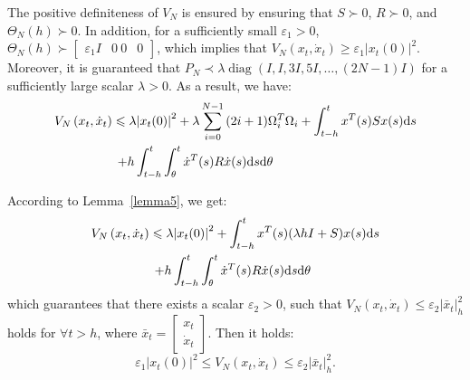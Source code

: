\documentclass[a4paper]{cas-sc}
\begin{document}
The positive definiteness of $V_N$ is ensured by ensuring that $S \succ 0$, $R \succ 0$, and ${\Theta _N}(h) \succ 0$. In addition, for a sufficiently small ${\varepsilon _1} > 0$, ${\Theta _N}(h) \succ \left[ {\begin{array}{*{20}{c}}
  {{\varepsilon_1}I} & 0 \
  0 & 0
  \end{array}} \right]$, which implies that ${V_N}\left( {{x_t},{{\dot x}_t}} \right) \geqslant {\varepsilon _1}{\left| {{x_t}(0)} \right|^2}$. Moreover, it is guaranteed that ${P_N} \prec \lambda \operatorname{diag} (I,I,3I,5I, \ldots ,(2N - 1)I)$ for a sufficiently large scalar $\lambda > 0$. As a result, we have:
\begin{equation}
  \begin{gathered}
    {V_N}\left( {{x_t},{{\dot x}_t}} \right) \leqslant \lambda {\left| {{x_t}(0)} \right|^2} + \lambda \sum\limits_{i = 0}^{N - 1} {(2i + 1)} \Omega _i^T{\Omega _i} + \int_{t - h}^t {{x^T}} (s)Sx(s){\text{d}}s \hfill \\
    \quad \quad \quad \quad \quad  + h\int_{t - h}^t {\int_\theta ^t {{{\dot x}^T}(s)R\dot x(s){\text{d}}s{\text{d}}\theta } }  \hfill \\
  \end{gathered}
  \label{D4}
\end{equation}

According to Lemma~\ref{lemma5}, we get:
\begin{equation}
  \begin{gathered}
    {V_N}\left( {{x_t},{{\dot x}_t}} \right) \leqslant \lambda {\left| {{x_t}(0)} \right|^2} + \int_{t - h}^t {{x^T}(s)(\lambda hI + S)x(s){\text{d}}s}  \hfill \\
    \quad \quad \quad \quad \quad  + h\int_{t - h}^t {\int_\theta ^t {{{\dot x}^T}(s)R\dot x(s){\text{d}}s{\text{d}}\theta } }  \hfill \\
  \end{gathered}
  \label{D5}
\end{equation}
which guarantees that there exists a scalar ${\varepsilon _2} > 0$, such that ${V_N}\left( {{x_t},{{\dot x}_t}} \right) \leqslant {\varepsilon _2}\left| {{{\bar x}_t}} \right|_h^2$ holds for $\forall t > h$, where ${\bar x_t} = \left[ {\begin{array}{*{20}{c}}
          {{x_t}} \\
          {{{\dot x}_t}}
        \end{array}} \right]$. Then it holds:
\begin{equation}
  {\varepsilon _1}{\left| {{x_t}(0)} \right|^2} \leqslant {V_N}\left( {{x_t},{{\dot x}_t}} \right) \leqslant {\varepsilon _2}\left| {{{\bar x}_t}} \right|_h^2.
  \label{D6}
\end{equation}
\end{document}
